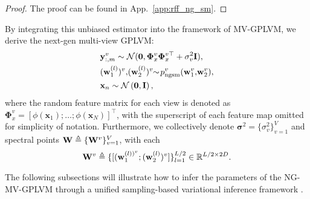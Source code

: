 \begin{proof}
    {\color{black}The proof can be found in App.~\ref{app:rff_ng_sm}.} 
\end{proof}
By integrating this unbiased estimator into the framework of MV-GPLVM, we derive the next-gen multi-view GPLVM: 
\begin{subequations}
\label{eq:Next-Gen SM in MV-GPLVM}
\begin{align}
& {\mathbf y}_{:, m}^{v} \sim \mathcal{N}(\mathbf{0}, \boldsymbol \Phi_x^v \boldsymbol \Phi_x ^{v \top} + \sigma^2_v \mathbf{I}),  \\ 
& (\mathbf{w}^{(l)}_1)^{v},\!(\mathbf{w}^{(l)}_2)^v\!\!\sim\! p_{\text{ngsm}}^v(\mathbf{w}_1^v,\!\mathbf{w}_2^v),  \\
& \mathbf{x}_n \sim \mathcal{N}\left(\mathbf{0}, \mathbf{I} \right),
\end{align} 
\end{subequations}
where the random feature matrix for each view is denoted as \( \bm{\Phi}_x^{v} = \left[\phi(\mathbf{x}_1); \ldots; \phi(\mathbf{x}_N)\right]^{\top}\), with the superscript of each feature map omitted for simplicity of notation. Furthermore, we collectively denote $\bm \sigma^2 = \{\sigma^2_{v}\}_{v=1}^{V}$ and spectral points ${\mathbf W} \triangleq \{ {\mathbf W}^{v} \}_{v=1}^{V}$, with each 
\begin{equation}
    {\mathbf W}^{v} \triangleq \{ [ (\mathbf{w}_1^{(l))^{v}}; ({\mathbf w}_2^{(l)})^{v} ]\}_{l=1}^{L/2} \in \mathbb{R}^{L/2 \times 2D}. 
\end{equation}

The following subsections will illustrate how to infer the parameters of the \MakeUppercase{ng-mv-gplvm} through a unified sampling-based variational inference framework \citep{kingma2013auto}. 
\vspace{-0.02in}
